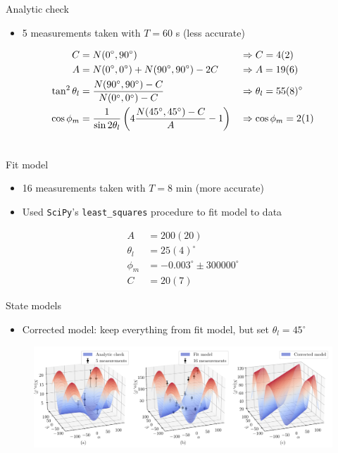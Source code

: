 \documentclass{../talk}
\renewcommand{\deg}{^\circ}
\begin{document}
\begin{frame}{Analytic check}
  \begin{itemize}
    \item 5 measurements taken with $T = 60$ s (less accurate)
  \end{itemize}
  \begin{align}
    C &= N(0\deg, 90\deg) &&\Rightarrow C = 4(2) \\
    A &= N(0\deg, 0\deg) + N(90\deg, 90\deg) - 2 C &&\Rightarrow A = 19(6) \\
    \tan^2\theta_l &= \frac{N(90\deg,90\deg) - C}{N(0\deg,0\deg) - C} &&\Rightarrow \theta_l = 55(8)\deg \\
    \cos\phi_m &= \frac{1}{\sin 2\theta_l} \left( 4 \frac{N(45\deg, 45\deg) - C}{A} - 1 \right) &&\Rightarrow \cos\phi_m = 2(1) \\ \notag
  \end{align}
\end{frame}

\begin{frame}{Fit model}
  \begin{itemize}
    \item 16 measurements taken with $T = 8$ min (more accurate)
    \item Used {\tt SciPy}'s {\tt least\_squares} procedure to fit model to data
  \end{itemize}
  \begin{align}
    A &= 200(20) \\
    \theta_l &= 25(4)\deg \\
    \phi_m &= -0.003\deg \pm 300000\deg \\
    C &= 20(7)
  \end{align}
\end{frame}

\begin{frame}{State models}
  \begin{itemize}
    \item Corrected model: keep everything from fit model, but set $\theta_l = 45\deg$
  \end{itemize}
  \begin{figure}
    \centering
    \includegraphics[width=\textwidth]{analysis/state.pdf}
    \caption{}
  \end{figure}
\end{frame}
\end{document}
